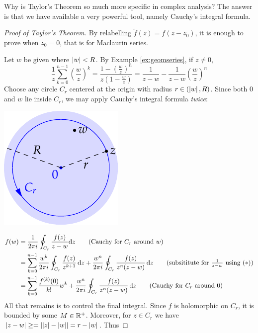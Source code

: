 Why is Taylor's Theorem so much more specific in complex analysis? The answer is that we have available a very powerful tool, namely Cauchy's integral formula.

\begin{proof}[Proof of Taylor's Theorem]
By relabelling $\tilde f(z)=f(z-z_0)$, it is enough to prove when $z_0=0$, that is for Maclaurin series.\par
\begin{minipage}[t]{0.7\linewidth}\vspace{-2pt}
Let $w$ be given where $\left| w\right|<R$. By Example \ref{ex:geomseries}, if $z\neq 0$,
\[
\frac 1z\sum_{k=0}^{n-1}\left(\frac wz\right)^k=\frac{1-\left(\frac wz\right)^n}{z(1-\frac wz)} =\frac 1{z-w}-\frac 1{z-w}\left(\frac wz\right)^n\tag{$\ast$}
\]
Choose any circle $C_r$ centered at the origin with radius $r\in(\left| w\right|,R)$. Since both $0$ and $w$ lie inside $C_r$, we may apply Cauchy's integral formula \emph{twice}:
\end{minipage}\begin{minipage}[t]{0.3\linewidth}\vspace{-2pt}
\flushright\includegraphics{taylor}
\end{minipage}\par
\vspace{-10pt}
\begin{align*}
f(w)&=\frac 1{2\pi i}\oint_{C_r}\frac{f(z)}{z-w}\dz\tag{Cauchy for $C_r$ around $w$}\\
	&=\sum_{k=0}^{n-1}\frac{w^k}{2\pi i}\oint_{C_r}\frac{f(z)}{z^{k+1}}\,\dz +\frac{w^n}{2\pi i}\oint_{C_r}\frac{f(z)}{z^n(z-w)}\,\dz\tag{subsititute for $\frac 1{z-w}$ using $(\ast)$}\\
 &=\sum_{k=0}^{n-1} \frac{f^{(k)}(0)}{k!}w^k +\frac{w^n}{2\pi i}\oint_{C_r}\frac{f(z)}{z^n(z-w)}\,\dz\tag{Cauchy for $C_r$ around $0$}
\end{align*}
All that remains is to control the final integral. Since $f$ is holomorphic on $C_r$, it is bounded by some $M\in\mathbb{R}^+$. Moreover, for $z\in C_r$ we have $\left| z-w\right|\ge =\left| \left| z\right|-\left| w\right|\right|= r-\left| w\right|$. Thus

\end{proof}

